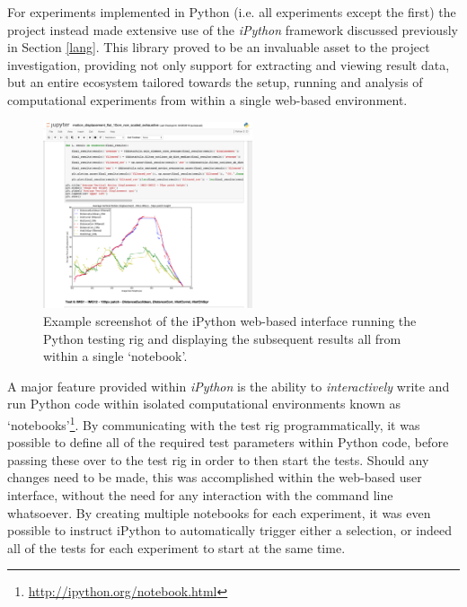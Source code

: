 For experiments implemented in Python (i.e. all experiments except the first) the project instead made extensive use of the \textit{iPython} framework \cite{ipython} discussed previously in Section \ref{lang}. This library proved to be an invaluable asset to the project investigation, providing not only support for extracting and viewing result data, but an entire ecosystem tailored towards the setup, running and analysis of computational experiments from within a single web-based environment. 

\begin{figure}
\vspace{-20pt}
  \begin{center}
    \includegraphics[width=0.55\textwidth]{images/ipython.png}
  \end{center}
  \vspace{-10pt}
  \caption{Example screenshot of the iPython web-based interface running the Python testing rig and displaying the subsequent results all from within a single `notebook'.}
     \label{fig:ipython}
  \vspace{-10pt}
\end{figure}

A major feature provided within \textit{iPython} is the ability to \textit{interactively} write and run Python code within isolated computational environments known as `notebooks'\footnote{\url{http://ipython.org/notebook.html}}. By communicating with the test rig programmatically, it was possible to define all of the required test parameters within Python code, before passing these over to the test rig in order to then start the tests. Should any changes need to be made, this was accomplished within the web-based user interface, without the need for any interaction with the command line whatsoever. By creating multiple notebooks for each experiment, it was even possible to instruct iPython to automatically trigger either a selection, or indeed all of the tests for each experiment to start at the same time. 


